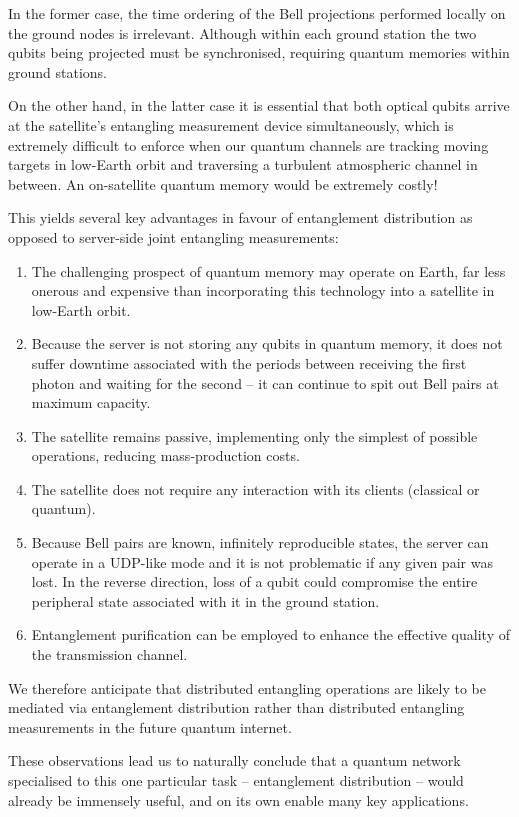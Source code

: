 In the former case, the time ordering of the Bell projections performed locally on the ground nodes is irrelevant. Although within each ground station the two qubits being projected must be synchronised, requiring quantum memories within ground stations.

On the other hand, in the latter case it is essential that both optical qubits arrive at the satellite's entangling measurement device simultaneously, which is extremely difficult to enforce when our quantum channels are tracking moving targets in low-Earth orbit and traversing a turbulent atmospheric channel in between. An on-satellite quantum memory would be extremely costly!

This yields several key advantages in favour of entanglement distribution as opposed to server-side joint entangling measurements:
\begin{enumerate}
	\item The challenging prospect of quantum memory may operate on Earth, far less onerous and expensive than incorporating this technology into a satellite in low-Earth orbit.
	\item Because the server is not storing any qubits in quantum memory, it does not suffer downtime associated with the periods between receiving the first photon and waiting for the second -- it can continue to spit out Bell pairs at maximum capacity.
	\item The satellite remains passive, implementing only the simplest of possible operations, reducing mass-production costs.
	\item The satellite does not require any interaction with its clients (classical or quantum).
	\item Because Bell pairs are known, infinitely reproducible states, the server can operate in a UDP-like mode and it is not problematic if any given pair was lost. In the reverse direction, loss of a qubit could compromise the entire peripheral state associated with it in the ground station.
	\item Entanglement purification can be employed to enhance the effective quality of the transmission channel.
\end{enumerate}

We therefore anticipate that distributed entangling operations are likely to be mediated via entanglement distribution rather than distributed entangling measurements in the future quantum internet.

These observations lead us to naturally conclude that a quantum network specialised to this one particular task -- entanglement distribution -- would already be immensely useful, and on its own enable many key applications.